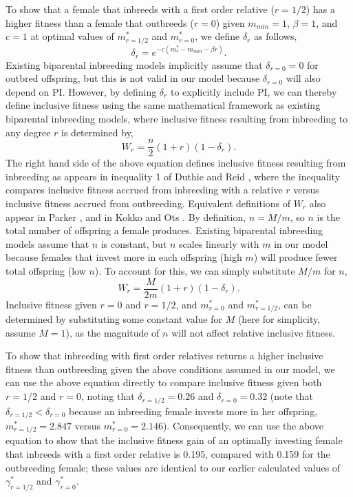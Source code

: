 \documentclass[12pt]{article}
\begin{document}
To show that a female that inbreeds with a first order relative ($r=1/2$) has a higher fitness than a female that outbreeds ($r=0$) given $m_{min}=1$, $\beta=1$, and $c=1$ at optimal values of $m^{*}_{r=1/2}$ and $m^{*}_{r=0}$, we define $\delta_{r}$ as follows,
\begin{equation}
\delta_{r} = e^{-c(m^{*}_{r}-m_{min}-\beta r)}.
\end{equation}
Existing biparental inbreeding models \cite[e.g.,][]{Duthie2015a, Parker2006, Kokko2006} implicitly assume that $\delta_{r=0}=0$ for outbred offspring, but this is not valid in our model because $\delta_{r=0}$ will also depend on PI. However, by defining $\delta_{r}$ to explicitly include PI, we can thereby define inclusive fitness using the same mathematical framework as existing biparental inbreeding models, where inclusive fitness resulting from inbreeding to any degree $r$ is determined by,
\begin{equation}
W_{r} = \frac{n}{2}\left(1+r\right)\left(1-\delta_{r}\right).
\end{equation}
The right hand side of the above equation defines inclusive fitness resulting from inbreeding as appears in inequality 1 of Duthie and Reid \cite{Duthie2015a}, where the inequality compares inclusive fitness accrued from inbreeding with a relative $r$ versus inclusive fitness accrued from outbreeding. Equivalent definitions of $W_{r}$ also appear in Parker \cite{Parker2006}, and in Kokko and Ots \cite{Kokko2006}. By definition, $n = M/m$, so $n$ is the total number of offspring a female produces. Existing biparental inbreeding models assume that $n$ is constant, but $n$ scales linearly with $m$ in our model because females that invest more in each offspring (high $m$) will produce fewer total offspring (low $n$). To account for this, we can simply substitute $M/m$ for $n$,
\begin{equation}
W_{r} = \frac{M}{2 m}\left(1+r\right)\left(1-\delta_{r}\right).
\end{equation}
Inclusive fitness given $r=0$ and $r=1/2$, and $m^{*}_{r=0}$ and $m^{*}_{r=1/2}$, can be determined by substituting some constant value for $M$ (here for simplicity, assume $M=1$), as the magnitude of $n$ will not affect relative inclusive fitness. 

To show that inbreeding with first order relatives returns a higher inclusive fitness than outbreeding given the above conditions assumed in our model, we can use the above equation directly to compare inclusive fitness given both $r=1/2$ and $r=0$, noting that $\delta_{r=1/2}=0.26$ and $\delta_{r=0}=0.32$ (note that $\delta_{r=1/2}<\delta_{r=0}$ because an inbreeding female invests more in her offspring, $m^{*}_{r=1/2}=2.847$ versus $m^{*}_{r=0}=2.146$). Consequently, we can use the above equation to show that the inclusive fitness gain of an optimally investing female that inbreeds with a first order relative is 0.195, compared with 0.159 for the outbreeding female; these values are identical to our earlier calculated values of $\gamma^{*}_{r=1/2}$ and $\gamma^{*}_{r=0}$.
\end{document}
